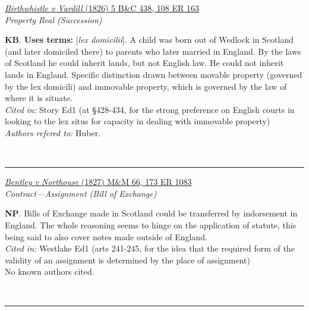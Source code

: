 \documentclass[twoside]{article}
\begin{document}
        \begin{small}
        \begin{center}
        \href{https://heinonline.org/HOL/P?h=hein.engrep/engrf0108&i=167}{\textit{Birthwhistle v Vardill} (1826) 5 B\&C 438, 108 ER 163} \label{133} \\ 
\textit{Property Real (Succession)}\\
        \end{center}
        \textbf{KB}.  \textbf{Uses terms: }[\textit{lex domicilii}]. A child was born out of Wedlock in Scotland (and later domiciled there) to parents who later married in England. By the laws of Scotland he could inherit lands, but not English law. He could not inherit lands in England. Specific distinction drawn between movable property (governed by the lex domicili) and immovable property, which is governed by the law of where it is situate.\\\textit{Cited in: }Story Ed1 (at §428-434, for the strong preference on English courts in looking to the lex situs for capacity in dealing with immovable property)\\\textit{Authors refered to: }Huber.
        \end{small}\\
        \rule{\textwidth}{0.5pt}
        

        \begin{small}
        \begin{center}
        \href{https://heinonline.org/HOL/P?h=hein.engrep/engrk0173&i=1087}{\textit{Bentley v Northouse} (1827) M\&M 66, 173 ER 1083} \label{49} \\ 
\textit{Contract---Assignment (Bill of Exchange)}\\
        \end{center}
        \textbf{NP}. Bills of Exchange made in Scotland could be transferred by indorsement in England. The whole reasoning seems to hinge on the application of statute, this being said to also cover notes made outside of England.\\\textit{Cited in: }Westlake Ed1 (arts 241-245, for the idea that the required form of the validity of an assignment is determined by the place of assignment)\\No known authors cited.
        \end{small}\\
        \rule{\textwidth}{0.5pt}
        
\end{document}
